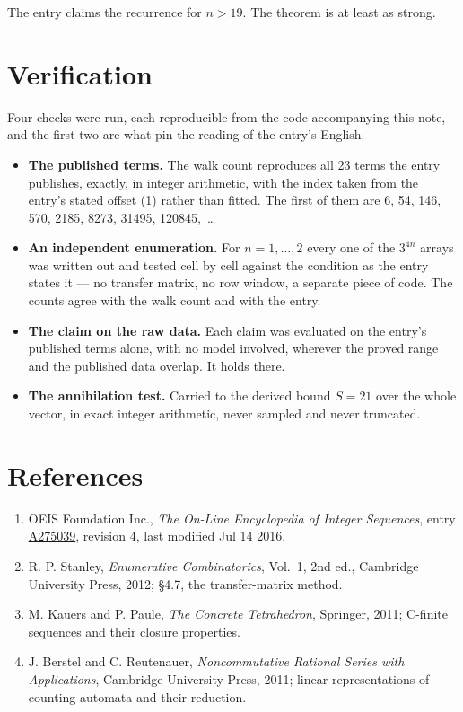 \documentclass[11pt]{article}
\theoremstyle{definition}
\begin{document}
The entry claims the recurrence for $n > 19$. The theorem is at least as strong.

\section{Verification}

Four checks were run, each reproducible from the code accompanying this note, and the first two are what pin the reading of the entry's English.

\begin{itemize}

\item {\bfseries The published terms.} The walk count reproduces all 23 terms the entry publishes, exactly, in integer arithmetic, with the index taken from the entry's stated offset (1) rather than fitted. The first of them are 6, 54, 146, 570, 2185, 8273, 31495, 120845,~\dots

\item {\bfseries An independent enumeration.} For $n = 1,\dots,2$ every one of the $3^{4n}$ arrays was written out and tested cell by cell against the condition as the entry states it --- no transfer matrix, no row window, a separate piece of code. The counts agree with the walk count and with the entry.

\item {\bfseries The claim on the raw data.} Each claim was evaluated on the entry's published terms alone, with no model involved, wherever the proved range and the published data overlap. It holds there.

\item {\bfseries The annihilation test.} Carried to the derived bound $S = 21$ over the whole vector, in exact integer arithmetic, never sampled and never truncated.

\end{itemize}

\section{References}

\begin{enumerate}

\item OEIS Foundation Inc., \emph{The On-Line Encyclopedia of Integer Sequences}, entry \href{https://oeis.org/A275039}{A275039}, revision 4, last modified Jul 14 2016.

\item R. P. Stanley, \emph{Enumerative Combinatorics}, Vol.~1, 2nd ed., Cambridge University Press, 2012; \S4.7, the transfer-matrix method.

\item M. Kauers and P. Paule, \emph{The Concrete Tetrahedron}, Springer, 2011; C-finite sequences and their closure properties.

\item J. Berstel and C. Reutenauer, \emph{Noncommutative Rational Series with Applications}, Cambridge University Press, 2011; linear representations of counting automata and their reduction.

\end{enumerate}
\end{document}

